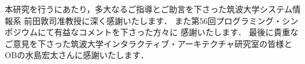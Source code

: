 \documentclass[a4paper,11pt,dvipdfmx]{jreport}
\makeatletter
\renewenvironment{thebibliography}[1]%
{\chapter*{\bibname\@mkboth{\bibname}{\bibname}}%
	\addcontentsline{toc}{chapter}{\numberline{}\bibname}%
	\list{\@biblabel{\@arabic\c@enumiv}}%
	{\settowidth\labelwidth{\@biblabel{#1}}%
		\leftmargin\labelwidth
		\advance\leftmargin\labelsep
		\@openbib@code
		\usecounter{enumiv}%
		\let\p@enumiv\@empty
		\renewcommand\theenumiv{\@arabic\c@enumiv}}%
	\sloppy
	\clubpenalty4000
	\@clubpenalty\clubpenalty
	\widowpenalty4000%
	\sfcode`\.\@m}
{\def\@noitemerr
	{\@latex@warning{Empty `thebibliography' environment}}%
	\endlist}
\makeatother
\begin{document}
本研究を行うにあたり，多大なるご指導とご助言を下さった筑波大学システム情報系
前田敦司准教授に深く感謝いたします．
また第56回プログラミング・シンポジウムにて有益なコメントを下さった方々に
感謝いたします．
最後に貴重なご意見を下さった筑波大学インタラクティブ・アーキテクチャ研究室の皆様と
OBの水島宏太さんに感謝いたします．

\newpage

\renewcommand{\bibname}{参考文献}




%
%
\end{document}
